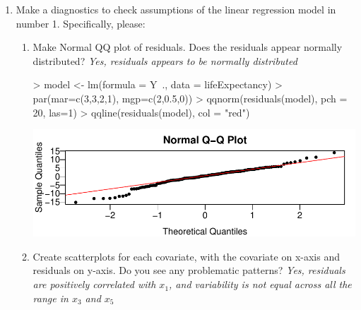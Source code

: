 \documentclass[12pt,a4paper]{paper}
\begin{document}
\begin{enumerate}
\begin{enumerate}
\begin{enumerate}
\begin{Schunk}
\begin{Sinput}
{+               data = lifeExpectancy[-x,])
+   Yhat <- predict(model,lifeExpectancy[x,2:7, drop=FALSE])
+   return((lifeExpectancy[x,1] - Yhat)^2)
+ })
> mean(SE)
\end{Sinput}
\begin{Soutput}
[1] 26.58507
\end{Soutput}
\end{Schunk}
\item Use bootstrap (1000 times) to estimate the standard deviation of your MSE estimate. (\texttt{set.seed(2)} before sampling)
\begin{Schunk}
\begin{Sinput}
> set.seed(2)
> b <- sapply(seq_len(1000), function(x){
+   mean(sample(SE, replace = TRUE))
+ })
> sd(b)
\end{Sinput}
\begin{Soutput}
[1] 3.736676
\end{Soutput}
\end{Schunk}
\end{enumerate}
\item Make a diagnostics to check assumptions of the linear regression model in number 1. Specifically, please:
\begin{enumerate}
\item Make Normal QQ plot of residuals. Does the residuals appear normally distributed? \textit{Yes, residuals appears to be normally distributed}
\begin{Schunk}
\begin{Sinput}
> model <- lm(formula = Y~., data = lifeExpectancy)
> par(mar=c(3,3,2,1), mgp=c(2,0.5,0))
> qqnorm(residuals(model), pch = 20, las=1)
> qqline(residuals(model), col = "red")
\end{Sinput}
\end{Schunk}
\includegraphics{HW5_DanielOsorio-004}
\item Create scatterplots for each covariate, with the covariate on x-axis and residuals on
y-axis. Do you see any problematic patterns? \textit{Yes, residuals are positively correlated with $x_{1}$, and variability is not equal across all the range in $x_{3}$ and $x_{5}$}

\end{enumerate}
\end{enumerate}
\end{enumerate}
\end{document}
